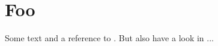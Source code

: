 \chapter*{Foo}
Some text and a reference to \cite{goossens93}. But also have a look in \cite{knuth79}...


